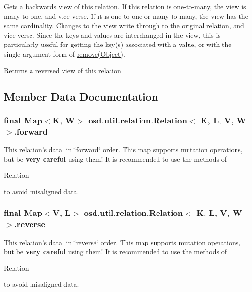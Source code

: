 Gets a backwards view of this relation. If this relation is one-\/to-\/many, the view is many-\/to-\/one, and vice-\/verse. If it is one-\/to-\/one or many-\/to-\/many, the view has the same cardinality. Changes to the view write through to the original relation, and vice-\/verse. Since the keys and values are interchanged in the view, this is particularly useful for getting the key(s) associated with a value, or with the single-\/argument form of \hyperlink{}{remove(\-Object)}. \begin{DoxyReturn}{Returns}
a reversed view of this relation 
\end{DoxyReturn}


\subsection{Member Data Documentation}
\hypertarget{classosd_1_1util_1_1relation_1_1_relation_3_01_k_00_01_l_00_01_v_00_01_w_01_4_ae599c04310669afbba36859aa6f1531c}{
\subsubsection[{forward}]{\setlength{\rightskip}{0pt plus 5cm}final Map$<$K, W$>$ osd.\-util.\-relation.\-Relation$<$ K, L, V, W $>$.forward\hspace{0.3cm}{\ttfamily [protected]}}}\label{classosd_1_1util_1_1relation_1_1_relation_3_01_k_00_01_l_00_01_v_00_01_w_01_4_ae599c04310669afbba36859aa6f1531c}
This relation's data, in \char`\"{}forward\char`\"{} order. This map supports mutation operations, but be {\bfseries very careful} using them! It is recommended to use the methods of
\begin{DoxyCode}
Relation 
\end{DoxyCode}
 to avoid misaligned data. \hypertarget{classosd_1_1util_1_1relation_1_1_relation_3_01_k_00_01_l_00_01_v_00_01_w_01_4_abaaa8f417c5097dd8b59141311170444}{
\subsubsection[{reverse}]{\setlength{\rightskip}{0pt plus 5cm}final Map$<$V, L$>$ osd.\-util.\-relation.\-Relation$<$ K, L, V, W $>$.reverse\hspace{0.3cm}{\ttfamily [protected]}}}\label{classosd_1_1util_1_1relation_1_1_relation_3_01_k_00_01_l_00_01_v_00_01_w_01_4_abaaa8f417c5097dd8b59141311170444}
This relation's data, in \char`\"{}reverse\char`\"{} order. This map supports mutation operations, but be {\bfseries very careful} using them! It is recommended to use the methods of
\begin{DoxyCode}
Relation 
\end{DoxyCode}
 to avoid misaligned data. 


